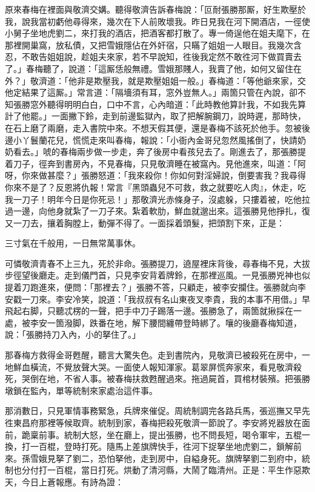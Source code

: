 原來春梅在裡面與敬濟交媾。聽得敬濟告訴春梅說：「叵耐張勝那厮，好生欺壓於我，說我當初虧他尋得來，幾次在下人前敗壞我。昨日見我在河下開酒店，一徑使小舅子坐地虎劉二，來打我的酒店，把酒客都打散了。專一倚逞他在姐夫麾下，在那裡開巢窩，放私債，又把雪娥隱佔在外奸宿，只瞞了姐姐一人眼目。我幾次含忍，不敢告姐姐說，趁姐夫來家，若不早說知，徃後我定然不敢徃河下做買賣去了。」春梅聽了，說道：「這厮恁般無禮。雪娥那賤人，我賣了他，如何又留住在外？」敬濟道：「他非是欺壓我，就是欺壓姐姐一般。」春梅道：「等他爺來家，交他定結果了這厮。」{}常言道：「隔墻須有耳，窓外豈無人。」兩箇只管在內說，卻不知張勝窓外聽得明明白白，口中不言，心內暗道：「此時教他算計我，不如我先算計了他罷。」{}一面撇下鈴，走到前邊監獄內，取了把解腕鋼刀，說時遲，那時快，在石上磨了兩磨，走入書院中來。不想天假其便，還是春梅不該死於他手。忽被後邊小丫鬟蘭花兒，慌慌走來叫春梅，報說：「小衙內金哥兒忽然風搖倒了，快請奶奶看去。」唬的春梅兩步做一步走，奔了後房中看孩兒去了。剛進去了，那張勝提着刀子，徑奔到書房內，不見春梅，只見敬濟睡在被窩內。見他進來，叫道：「阿呀，你來做甚麼？」張勝怒道：「我來殺你！{}你如何對淫婦說，倒要害我？我尋得你來不是了？反恩將仇報！常言『黑頭蟲兒不可救，救之就要吃人肉』，休走，吃我一刀子！明年今日是你死忌！」{}那敬濟光赤條身子，沒處躲，只摟着被，吃他拉過一邊，向他身就紮了一刀子來。紮着軟肋，鮮血就邈出來。這張勝見他掙扎，復又一刀去，攘着胸膛上，動彈不得了。一面採着頭髮，把頭割下來，{}正是：

\begin{myquote}
三寸氣在千般用，一日無常萬事休。
\end{myquote}

可憐敬濟青春不上三九，死於非命。張勝提刀，遶屋裡床背後，尋春梅不見，大拔步徑望後廳走。走到儀門首，只見李安背着牌鈴，在那裡巡風。一見張勝兇神也似提着刀跑進來，便問：「那裡去？」張勝不答，只顧走，被李安攔住。張勝就向李安戳一刀來。李安冷笑，說道：「我叔叔有名山東夜叉李貴，我的本事不用借。」早飛起右脚，只聽忒楞的一聲，把手中刀子踢落一邊。{}張勝急了，兩箇就揪採在一處，被李安一箇潑脚，跌番在地，解下腰間纏帶登時綁了。嚷的後廳春梅知道，說：「張勝持刀入內，小的拏住了。」

那春梅方救得金哥甦醒，聽言大驚失色。走到書院內，見敬濟已被殺死在房中，一地鮮血橫流，不覺放聲大哭。一面使人報知渾家。葛翠屏慌奔家來，看見敬濟殺死，哭倒在地，不省人事。被春梅扶救甦醒過來。拖過屍首，買棺材裝殯。把張勝墩鎖在監內，單等統制來家處治這件事。

那消數日，只見軍情事務緊急，兵牌來催促。周統制調完各路兵馬，張巡撫又早先徃東昌府那裡等候取齊。統制到家，春梅把殺死敬濟一節說了。李安將兇器放在面前，跪稟前事。統制大怒，坐在廳上，提出張勝，也不問長短，喝令軍牢，五棍一換，打一百棍，登時打死。隨馬上差旗牌快手，徃河下捉拏坐地虎劉二，鎖解前來。孫雪娥見拏了劉二，恐怕拏他，走到房中，自縊身死。旗牌拏劉二到府中，統制也分付打一百棍，當日打死。{}烘動了清河縣，大鬧了臨清州。正是：平生作惡欺天，今日上蒼報應。有詩為證：

